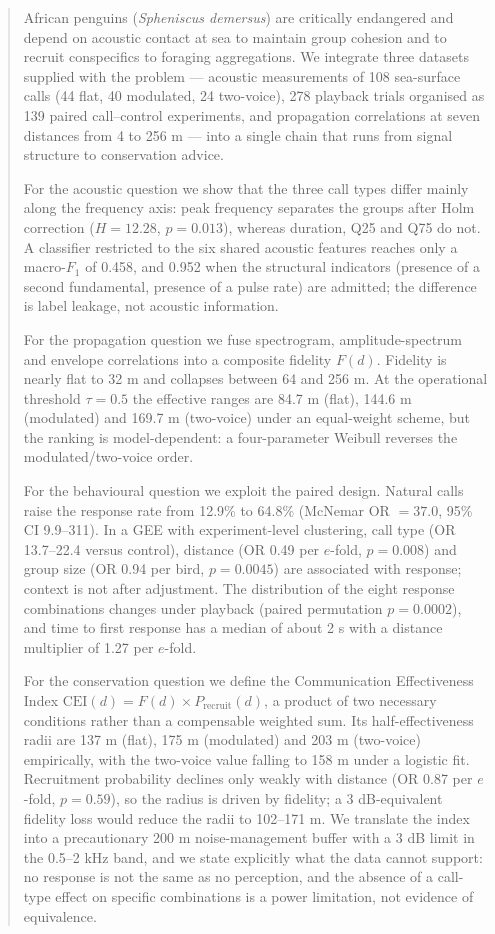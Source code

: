 \documentclass{apmcmthesis}
\begin{document}
\pagestyle{frontmatterstyle}

\begin{abstract}
African penguins (\textit{Spheniscus demersus}) are critically endangered and depend on
acoustic contact at sea to maintain group cohesion and to recruit conspecifics to foraging
aggregations. We integrate three datasets supplied with the problem --- acoustic measurements
of 108 sea-surface calls (44 flat, 40 modulated, 24 two-voice), 278 playback trials organised
as 139 paired call--control experiments, and propagation correlations at seven distances from
4 to 256 m --- into a single chain that runs from signal structure to conservation advice.

For the acoustic question we show that the three call types differ mainly along the frequency
axis: peak frequency separates the groups after Holm correction ($H=12.28$, $p=0.013$), whereas
duration, Q25 and Q75 do not. A classifier restricted to the six shared acoustic features
reaches only a macro-$F_1$ of 0.458, and 0.952 when the structural indicators (presence of a
second fundamental, presence of a pulse rate) are admitted; the difference is label leakage,
not acoustic information.

For the propagation question we fuse spectrogram, amplitude-spectrum and envelope correlations
into a composite fidelity $F(d)$. Fidelity is nearly flat to 32 m and collapses between 64 and
256 m. At the operational threshold $\tau=0.5$ the effective ranges are 84.7 m (flat),
144.6 m (modulated) and 169.7 m (two-voice) under an equal-weight scheme, but the ranking is
model-dependent: a four-parameter Weibull reverses the modulated/two-voice order.

For the behavioural question we exploit the paired design. Natural calls raise the response
rate from 12.9\% to 64.8\% (McNemar OR $=37.0$, 95\% CI 9.9--311). In a GEE with experiment-level
clustering, call type (OR 13.7--22.4 versus control), distance (OR 0.49 per $e$-fold, $p=0.008$)
and group size (OR 0.94 per bird, $p=0.0045$) are associated with response; context is not after
adjustment. The distribution of the eight response combinations changes under playback
(paired permutation $p=0.0002$), and time to first response has a median of about 2 s with a
distance multiplier of 1.27 per $e$-fold.

For the conservation question we define the Communication Effectiveness Index
$\mathrm{CEI}(d)=F(d)\times P_{\mathrm{recruit}}(d)$, a product of two necessary conditions rather
than a compensable weighted sum. Its half-effectiveness radii are 137 m (flat), 175 m (modulated)
and 203 m (two-voice) empirically, with the two-voice value falling to 158 m under a logistic fit.
Recruitment probability declines only weakly with distance (OR 0.87 per $e$-fold, $p=0.59$), so
the radius is driven by fidelity; a 3 dB-equivalent fidelity loss would reduce the radii to
102--171 m. We translate the index into a
precautionary 200 m noise-management buffer with a 3 dB limit in the 0.5--2 kHz band, and we state
explicitly what the data cannot support: no response is not the same as no perception, and the
absence of a call-type effect on specific combinations is a power limitation, not evidence of
equivalence.


\end{abstract}
\end{document}
